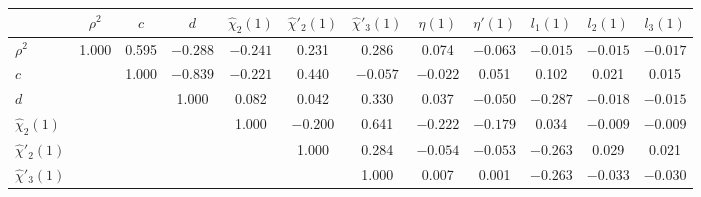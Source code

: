 \documentclass[aps,superscriptaddress,showpacs,nofootinbib,11pt]{revtex4-1}
\newcommand\tstrut{\rule{0pt}{2.9ex}}       %
\begin{document}
\begin{table}[t]
\begin{ruledtabular}
\begin{center}
\begin{tabular}{lccccccccccc}
& $\rho^2$& $c$&$d$&$\hat\chi_2(1)$&$\hat\chi'_2(1)$&$\hat\chi'_3(1)$&$\eta(1)$&$\eta'(1)$&$l_1(1)$&$l_2(1)$&$l_3(1)$
\\ \hline \tstrut
$\rho^2$  & 1.000&	  0.595& 	$-0.288$&     $-0.241$ &   \hspace{0.25cm}0.231&   \hspace{0.25cm}0.286 &     \hspace{0.25cm}0.074 & $-0.063$& $-0.015$& $-0.015$&$-0.017$\\
  $c$  & &1.000&    $-0.839$& $-0.221$& \hspace{0.25cm}0.440 &  $-0.057$&    $ -0.022$&      \hspace{0.25cm}0.051  &   \hspace{0.25cm}0.102 &   \hspace{0.25cm}0.021&      \hspace{0.25cm}0.015\\
$d$  & &&\hspace{0.25cm}1.000&   \hspace{0.25cm}0.082&    \hspace{0.25cm}0.042&      \hspace{0.25cm}0.330&   \hspace{0.25cm}0.037& 	 $-0.050$& 	$-0.287$ &    $-0.018$&     $-0.015$\\
 $\hat\chi_2(1)$  & &&&\hspace{0.25cm}1.000&	 $-0.200$& 	\hspace{0.25cm}0.641&     $-0.222$ &    $-0.179$&     \hspace{0.25cm}0.034 &   $ -0.009$&     $-0.009$\\
  $\hat\chi'_2(1)$ & &&&&\hspace{0.25cm}1.000 &   \hspace{0.25cm}0.284 &    $-0.054$&     $-0.053$& 	 $-0.263$& 	\hspace{0.25cm}0.029& 	\hspace{0.25cm}0.021\\
  $\hat\chi'_3(1)$ & &&&&&\hspace{0.25cm}1.000&	\hspace{0.25cm}0.007&    \hspace{0.25cm}0.001 &    $-0.263$ &    $-0.033$&     $-0.030$\\

\end{tabular}
\end{center}
\end{ruledtabular}
\end{table}
\end{document}
